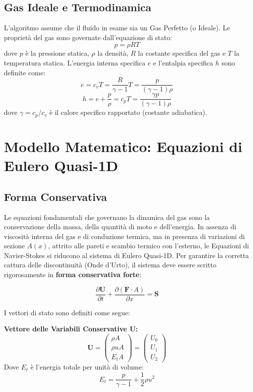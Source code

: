 \documentclass[11pt,a4paper]{article}
\begin{document}
\subsection{Gas Ideale e Termodinamica}
L'algoritmo assume che il fluido in esame sia un Gas Perfetto (o Ideale). Le proprietà del gas sono governate dall'equazione di stato:
\begin{equation}
p = \rho R T
\end{equation}
dove $p$ è la pressione statica, $\rho$ la densità, $R$ la costante specifica del gas e $T$ la temperatura statica. L'energia interna specifica $e$ e l'entalpia specifica $h$ sono definite come:
\begin{equation}
e = c_v T = \frac{R}{\gamma - 1}T = \frac{p}{(\gamma - 1)\rho}
\end{equation}
\begin{equation}
h = e + \frac{p}{\rho} = c_p T = \frac{\gamma p}{(\gamma - 1)\rho}
\end{equation}
dove $\gamma = c_p / c_v$ è il calore specifico rapportato (costante adiabatica).

\section{Modello Matematico: Equazioni di Eulero Quasi-1D}

\subsection{Forma Conservativa}
Le equazioni fondamentali che governano la dinamica del gas sono la conservazione della massa, della quantità di moto e dell'energia. In assenza di viscosità interna del gas e di conduzione termica, ma in presenza di variazioni di sezione $A(x)$, attrito alle pareti e scambio termico con l'esterno, le Equazioni di Navier-Stokes si riducono al sistema di Eulero Quasi-1D. Per garantire la corretta cattura delle discontinuità (Onde d'Urto), il sistema deve essere scritto rigorosamente in \textbf{forma conservativa forte}:

\begin{equation}
\frac{\partial \mathbf{U}}{\partial t} + \frac{\partial (\mathbf{F} \cdot A)}{\partial x} = \mathbf{S}
\end{equation}

I vettori di stato sono definiti come segue:

\textbf{Vettore delle Variabili Conservative $\mathbf{U}$:}
\begin{equation}
\mathbf{U} = \begin{pmatrix} \rho A \\ \rho u A \\ E_t A \end{pmatrix} = \begin{pmatrix} U_0 \\ U_1 \\ U_2 \end{pmatrix}
\end{equation}
Dove $E_t$ è l'energia totale per unità di volume:
\begin{equation}
E_t = \frac{p}{\gamma - 1} + \frac{1}{2} \rho u^2
\end{equation}
\end{document}
